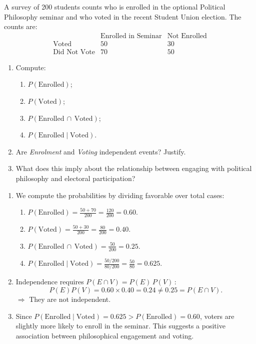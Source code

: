 \documentclass[11pt]{exam}
\begin{document}
\begin{questions}

\question[2.5]
A survey of 200 students counts who is enrolled in the optional Political Philosophy seminar and who voted in the recent Student Union election. The counts are:
\[
\begin{array}{l|cc}
 & \text{Enrolled in Seminar} & \text{Not Enrolled} \\ \hline
\text{Voted}      & 50 & 30 \\
\text{Did Not Vote}& 70 & 50
\end{array}
\]
\begin{enumerate}[label=(\alph*)]
    \item Compute:
    \begin{enumerate}[label=(\roman*)]
        \item $P(\text{Enrolled})$;
        \item $P(\text{Voted})$;
        \item $P(\text{Enrolled}\,\cap\,\text{Voted})$;
        \item $P(\text{Enrolled}\mid \text{Voted})$.
    \end{enumerate}
    \item Are \emph{Enrolment} and \emph{Voting} independent events? Justify.
    \item What does this imply about the relationship between engaging with political philosophy and electoral participation?
\end{enumerate}

\begin{solution}[0cm]
\begin{enumerate}[label=(\alph*)]
    \item We compute the probabilities by dividing favorable over total cases:
    \begin{enumerate}[label=(\roman*)]
        \item $P(\text{Enrolled}) = \frac{50 + 70}{200} = \frac{120}{200} = 0.60$.
        \item $P(\text{Voted}) = \frac{50 + 30}{200} = \frac{80}{200} = 0.40$.
        \item $P(\text{Enrolled}\,\cap\,\text{Voted}) = \frac{50}{200} = 0.25$.
        \item $P(\text{Enrolled}\mid \text{Voted}) = \frac{50/200}{80/200} = \frac{50}{80} = 0.625$.
    \end{enumerate}
    \item Independence requires $P(E\cap V)=P(E)\,P(V)\,$:
    \[
      P(E)P(V)=0.60\times0.40=0.24\neq 0.25=P(E\cap V).
    \]
    $\Rightarrow$ They are not independent.
    \item Since $P(\text{Enrolled}\mid \text{Voted})=0.625>P(\text{Enrolled})=0.60$, voters are slightly more likely to enroll in the seminar. This suggests a positive association between philosophical engagement and voting.
\end{enumerate}
\end{solution}


\end{questions}
\end{document}
